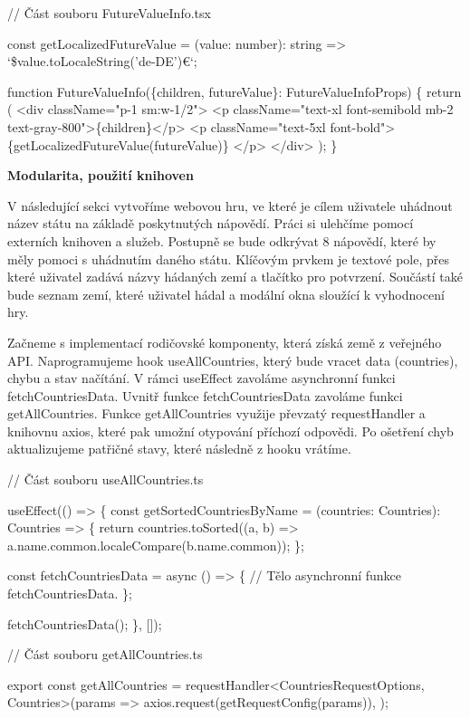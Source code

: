 \begin{prog}
// Část souboru FutureValueInfo.tsx

const getLocalizedFutureValue = (value: number): string => 
  `\${value.toLocaleString('de-DE')}€`;

function FutureValueInfo(\{children, futureValue\}: FutureValueInfoProps) \{
  return (
    <div className="p-1 sm:w-1/2">
      <p className="text-xl font-semibold mb-2 text-gray-800">\{children\}</p>
      <p className="text-5xl font-bold">
        \{getLocalizedFutureValue(futureValue)\}
      </p>
    </div>
  );
\}
\end{prog}

\begin{flushleft}
  \textbf{Modularita, použití knihoven}
\end{flushleft}

V následující sekci vytvoříme webovou hru, ve které je cílem uživatele uhádnout název státu na základě poskytnutých nápovědí. Práci si ulehčíme pomocí externích knihoven a služeb.
Postupně se bude odkrývat 8 nápovědí, které by měly pomoci s uhádnutím daného státu. Klíčovým prvkem je textové pole, přes které uživatel zadává názvy hádaných zemí a tlačítko pro potvrzení. 
Součástí také bude seznam zemí, které uživatel hádal a modální okna sloužící k vyhodnocení hry.

Začneme s implementací rodičovské komponenty, která získá země z veřejného API. Naprogramujeme hook useAllCountries, který bude vracet data (countries), chybu a stav načítání. 
V rámci useEffect zavoláme asynchronní funkci fetchCountriesData. Uvnitř funkce fetchCountriesData zavoláme funkci getAllCountries. 
Funkce getAllCountries využije převzatý requestHandler a knihovnu axios, které pak umožní otypování příchozí odpovědi. Po ošetření chyb aktualizujeme patřičné stavy, které následně z hooku vrátíme. 

\begin{prog}
// Část souboru useAllCountries.ts

useEffect(() => \{
  const getSortedCountriesByName = (countries: Countries): Countries => \{
    return countries.toSorted((a, b) => 
      a.name.common.localeCompare(b.name.common));
  \};

  const fetchCountriesData = async () => \{
    // Tělo asynchronní funkce fetchCountriesData.
  \};

  fetchCountriesData();
\}, []);

// Část souboru getAllCountries.ts

export const getAllCountries = 
  requestHandler<CountriesRequestOptions, Countries>(params =>
    axios.request(getRequestConfig(params)),
  );
\end{prog}

